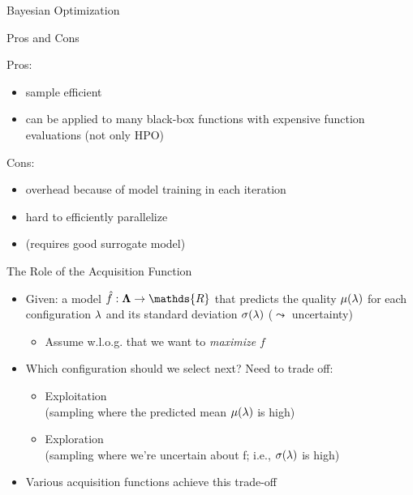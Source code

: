\begin{frame}[c,fragile]{Bayesian Optimization}

\begin{block}{Pros and Cons}

Pros:
\begin{itemize}
  \item sample efficient
  \item can be applied to many black-box functions with expensive function evaluations (not only HPO)
\end{itemize}

Cons:
\begin{itemize}
  \item overhead because of model training in each iteration
  \item hard to efficiently parallelize
  \item (requires good surrogate model)
\end{itemize}

\end{block}

\end{frame}


\begin{frame}[c,fragile]{The Role of the Acquisition Function}
\begin{itemize}
  \item Given: a model $\hat{f}:\confs \rightarrow \mathds{R}$ that predicts the quality $\mu(\mathbf{\lambda})$ for each configuration $\mathbf{\lambda}$ and its standard deviation $\sigma(\mathbf{\lambda})$ ($\leadsto$ uncertainty)
  \begin{itemize}
  	\item Assume w.l.o.g. that we want to \emph{maximize} $f$
  \end{itemize}
  \medskip
  \pause
  \item Which configuration should we select next? Need to trade off: 
  \begin{itemize}
    \item \alert{Exploitation}\\(sampling where the predicted mean $\mu(\mathbf{\lambda})$ is high)
    \item \alert{Exploration}\\(sampling where we're uncertain about f; i.e., $\sigma(\mathbf{\lambda})$ is high)
  \end{itemize}
  \medskip
  \pause
  \item Various acquisition functions achieve this trade-off
\end{itemize}

\end{frame}


